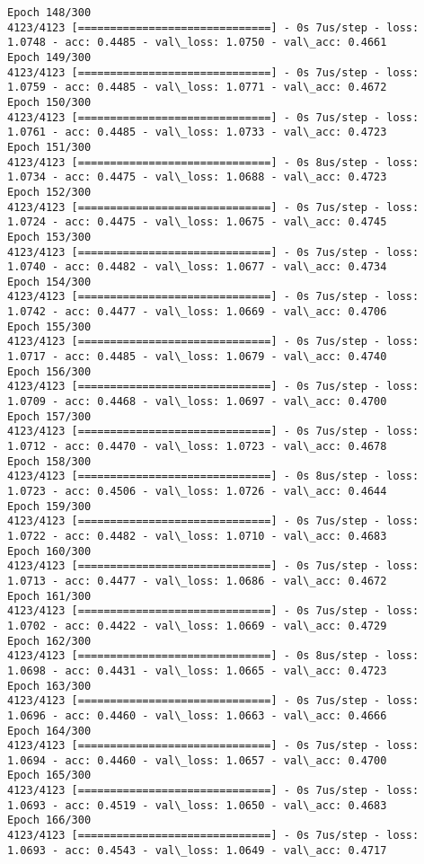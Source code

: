 \documentclass[11pt]{article}
\begin{document}
\begin{Verbatim}[commandchars=\\\{\}]
Epoch 148/300
4123/4123 [==============================] - 0s 7us/step - loss: 1.0748 - acc: 0.4485 - val\_loss: 1.0750 - val\_acc: 0.4661
Epoch 149/300
4123/4123 [==============================] - 0s 7us/step - loss: 1.0759 - acc: 0.4485 - val\_loss: 1.0771 - val\_acc: 0.4672
Epoch 150/300
4123/4123 [==============================] - 0s 7us/step - loss: 1.0761 - acc: 0.4485 - val\_loss: 1.0733 - val\_acc: 0.4723
Epoch 151/300
4123/4123 [==============================] - 0s 8us/step - loss: 1.0734 - acc: 0.4475 - val\_loss: 1.0688 - val\_acc: 0.4723
Epoch 152/300
4123/4123 [==============================] - 0s 7us/step - loss: 1.0724 - acc: 0.4475 - val\_loss: 1.0675 - val\_acc: 0.4745
Epoch 153/300
4123/4123 [==============================] - 0s 7us/step - loss: 1.0740 - acc: 0.4482 - val\_loss: 1.0677 - val\_acc: 0.4734
Epoch 154/300
4123/4123 [==============================] - 0s 7us/step - loss: 1.0742 - acc: 0.4477 - val\_loss: 1.0669 - val\_acc: 0.4706
Epoch 155/300
4123/4123 [==============================] - 0s 7us/step - loss: 1.0717 - acc: 0.4485 - val\_loss: 1.0679 - val\_acc: 0.4740
Epoch 156/300
4123/4123 [==============================] - 0s 7us/step - loss: 1.0709 - acc: 0.4468 - val\_loss: 1.0697 - val\_acc: 0.4700
Epoch 157/300
4123/4123 [==============================] - 0s 7us/step - loss: 1.0712 - acc: 0.4470 - val\_loss: 1.0723 - val\_acc: 0.4678
Epoch 158/300
4123/4123 [==============================] - 0s 8us/step - loss: 1.0723 - acc: 0.4506 - val\_loss: 1.0726 - val\_acc: 0.4644
Epoch 159/300
4123/4123 [==============================] - 0s 7us/step - loss: 1.0722 - acc: 0.4482 - val\_loss: 1.0710 - val\_acc: 0.4683
Epoch 160/300
4123/4123 [==============================] - 0s 7us/step - loss: 1.0713 - acc: 0.4477 - val\_loss: 1.0686 - val\_acc: 0.4672
Epoch 161/300
4123/4123 [==============================] - 0s 7us/step - loss: 1.0702 - acc: 0.4422 - val\_loss: 1.0669 - val\_acc: 0.4729
Epoch 162/300
4123/4123 [==============================] - 0s 8us/step - loss: 1.0698 - acc: 0.4431 - val\_loss: 1.0665 - val\_acc: 0.4723
Epoch 163/300
4123/4123 [==============================] - 0s 7us/step - loss: 1.0696 - acc: 0.4460 - val\_loss: 1.0663 - val\_acc: 0.4666
Epoch 164/300
4123/4123 [==============================] - 0s 7us/step - loss: 1.0694 - acc: 0.4460 - val\_loss: 1.0657 - val\_acc: 0.4700
Epoch 165/300
4123/4123 [==============================] - 0s 7us/step - loss: 1.0693 - acc: 0.4519 - val\_loss: 1.0650 - val\_acc: 0.4683
Epoch 166/300
4123/4123 [==============================] - 0s 7us/step - loss: 1.0693 - acc: 0.4543 - val\_loss: 1.0649 - val\_acc: 0.4717

\end{Verbatim}
\end{document}
